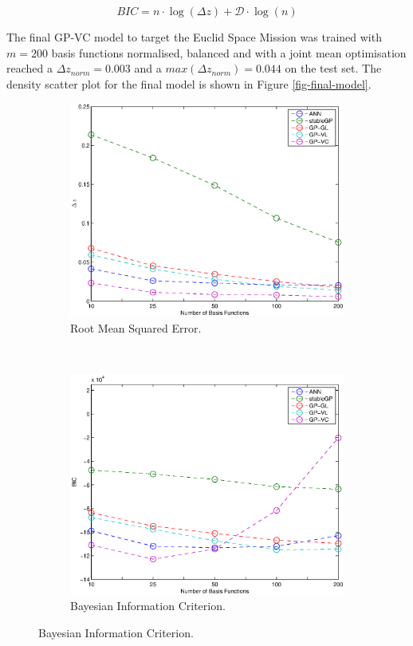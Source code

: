 \documentclass[useAMS,usenatbib,fleqn]{mn2e}
\begin{document}
\begin{equation}
\label{eq-bic}
BIC = n \cdot \log(\Delta z)+\mathcal{D}\cdot \log(n)
\end{equation}

The final GP-VC model to target the Euclid Space Mission was trained with $m=200$ basis functions normalised, balanced and with a joint mean optimisation reached a $\Delta z_{norm}=0.003$ and a  $max(\Delta z_{norm})=0.044$ on the test set. The density scatter plot for the final model is shown in Figure \ref{fig-final-model}.

\begin{figure}
        \centering
        
        \begin{subfigure}[b]{0.45\textwidth}
                \includegraphics[width=\textwidth]{figures/different-basis.eps}
                 \caption{Root Mean Squared Error.} 
                 \label{fig-rmses}
        \end{subfigure}
	~
       \begin{subfigure}[b]{0.45\textwidth}
                \includegraphics[width=\textwidth]{figures/BIC.eps}
                 \caption{Bayesian Information Criterion.} 
                 \label{fig-bic}
        \end{subfigure}


\end{figure}
\end{document}
